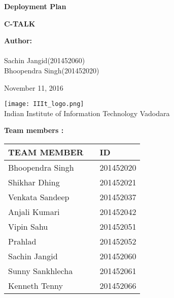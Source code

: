 \documentclass[12pt]{article}
\def\mydate{November 11, 2016}
\begin{document}
	
	\begin{titlepage}
		\begin{center}
			
			
			\LARGE{\textbf{Deployment Plan}}
			
			\vspace{1.5cm}
			
			\textbf{C-TALK}\\
			
			\vspace{2cm}
		 
        \large{\textbf{Author:}}\\
			  \large{ \\ Sachin Jangid(201452060) \\ Bhoopendra Singh(201452020)\\}	
			  
			  
			\vspace{1.5cm}
			\mydate{}
			
			
			\vspace{5cm}
			\texttt{[image: IIIt\_logo.png]} \\
			\Large{Indian Institute of Information Technology Vadodara} \\
			
		\end{center}
	\end{titlepage}
	\textbf{Team members :} \\
		\begin{center}
		
		\begin{tabular}{ |m{10em} m{8em} m{9em}|}
			\hline
			TEAM MEMBER          &   & ID        \\
			\hline
			Bhoopendra Singh     &   & 201452020 \\
			Shikhar Dhing        &   & 201452021 \\
			Venkata Sandeep      &   & 201452037 \\
			Anjali Kumari        &   & 201452042 \\
			Vipin Sahu           &   & 201452051 \\
			Prahlad              &   & 201452052 \\ 
			Sachin Jangid        &   & 201452060 \\
			Sunny Sankhlecha     &   & 201452061 \\
			Kenneth Tenny        &   & 201452066 \\
			\hline
		\end{tabular}
		
	\end{center}
	\vspace{2em}
	
\end{document}
